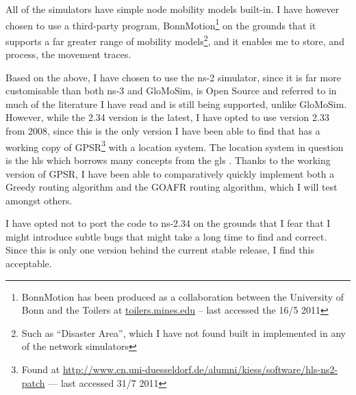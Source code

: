All of the simulators have simple node mobility models built-in. I have however chosen to use a third-party program, BonnMotion\footnote{BonnMotion has been produced as a collaboration between the University of Bonn and the Toilers at \url{toilers.mines.edu} -- last accessed the 16/5 2011} on the grounds that it supports a far greater range of mobility models\footnote{Such as ``Disaster Area'', which I have not found built in implemented in any of the network simulators}, and it enables me to store, and process, the movement traces.

Based on the above, I have chosen to use the ns-2 simulator, since it is far more customisable than both ns-3 and GloMoSim, is Open Source and referred to in much of the literature I have read \cite{directed, gpsr, energyConservation, two-tier} and is still being supported, unlike GloMoSim. However, while the 2.34 version is the latest, I have opted to use version 2.33 from 2008, since this is the only version I have been able to find that has a working copy of GPSR\footnote{Found at \url{http://www.cn.uni-duesseldorf.de/alumni/kiess/software/hls-ns2-patch} --- last accessed 31/7 2011} with a location system. The location system in question is the \ac{hls} which borrows many concepts from the \ac{gls} \cite{hls}. Thanks to the working version of GPSR, I have been able to comparatively quickly implement both a Greedy routing algorithm and the GOAFR routing algorithm, which I will test amongst others. 

I have opted not to port the code to ns-2.34 on the grounds that I fear that I might introduce subtle bugs that might take a long time to find and correct. Since this is only one version behind the current stable release, I find this acceptable.

